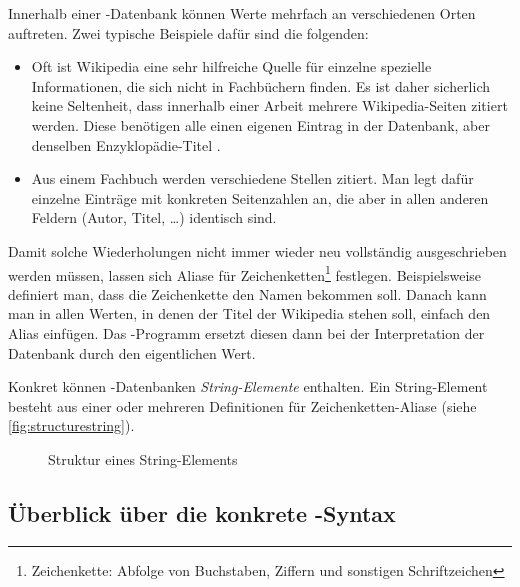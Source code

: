 Innerhalb einer \mbox{\BibTeX-}Datenbank können Werte mehrfach an verschiedenen
Orten auftreten. Zwei typische Beispiele dafür sind die folgenden:
\begin{itemize}
    \item Oft ist Wikipedia eine sehr hilfreiche Quelle für einzelne spezielle
        Informationen, die sich nicht in Fachbüchern finden. Es ist daher
        sicherlich keine Seltenheit, dass innerhalb einer Arbeit mehrere
        Wikipedia-Seiten zitiert werden. Diese benötigen alle einen eigenen
        Eintrag in der Datenbank, aber denselben Enzyklopädie-Titel \temp.
    \item Aus einem Fachbuch werden verschiedene Stellen zitiert. Man legt dafür
        einzelne Einträge mit konkreten Seitenzahlen an, die aber in allen
        anderen Feldern (Autor, Titel, \dots) identisch sind.
\end{itemize}
Damit solche Wiederholungen nicht immer wieder neu vollständig ausgeschrieben
werden müssen, lassen sich Aliase für Zeichenketten\footnote{
    {\titlelike Zeichenkette:} Abfolge von Buchstaben, Ziffern und sonstigen Schriftzeichen
} festlegen. Beispielsweise definiert man, dass die Zeichenkette \temp{} den
Namen  bekommen soll. Danach kann man in allen Werten, in denen der Titel der Wikipedia stehen soll, einfach den Alias 
einfügen. Das \mbox{\BibTeX-}Programm ersetzt diesen dann bei der Interpretation
der Datenbank durch den eigentlichen Wert.

Konkret können \mbox{\BibTeX-}Datenbanken \emph{String-Elemente} enthalten. Ein
String-Element besteht aus einer oder mehreren Definitionen für Zeichenketten-Aliase (siehe \autoref{fig:structurestring}).

\begin{figure}
    \centering
    \caption{Struktur eines String-Elements}
    \label{fig:structurestring}
\end{figure}

\subsection{Überblick über die konkrete \mbox{\BibTeX-}Syntax}
